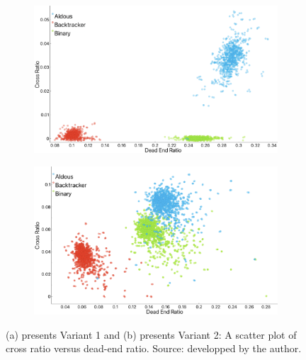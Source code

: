          \begin{figure}[!h]
            \centering
            \begin{subfigure}[!h]{0.7\textwidth}
                \includegraphics[width=1\linewidth]{crossvSDeas_variant1.png}
               \caption{}
            \end{subfigure}
            \begin{subfigure}[!h]{0.7\textwidth}
                \includegraphics[width=1\linewidth]{crossvSDead_variant2.png}
               \caption{}
            \end{subfigure}
            \caption{(a) presents Variant 1 and (b) presents Variant 2: A scatter plot of cross ratio versus dead-end ratio. Source: developped by the author.}
            \end{figure}
\newpage
\newpage
\newline
\newpage\
\\
\\
\\
\\
\\
\newline
\newline
\newline
\newline
\newpage
\newline
\newpage\
\\
\\
\\
\\
\\
\newline
\newline
\newline
\newline
